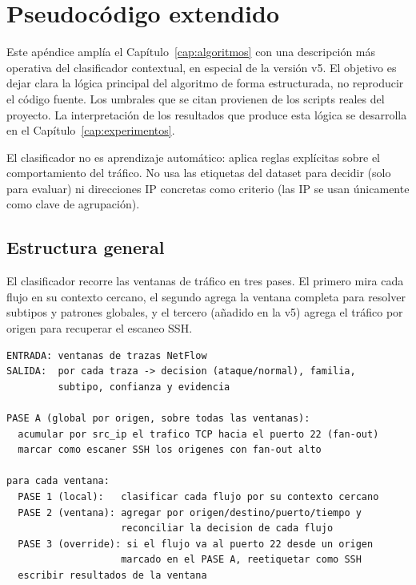 \chapter{Pseudocódigo extendido}
\label{ap:pseudocodigo}

Este apéndice amplía el Capítulo~\ref{cap:algoritmos} con una descripción más operativa del clasificador contextual, en especial de la versión v5. El objetivo es dejar clara la lógica principal del algoritmo de forma estructurada, no reproducir el código fuente. Los umbrales que se citan provienen de los scripts reales del proyecto. La interpretación de los resultados que produce esta lógica se desarrolla en el Capítulo~\ref{cap:experimentos}.

El clasificador no es aprendizaje automático: aplica reglas explícitas sobre el comportamiento del tráfico. No usa las etiquetas del dataset para decidir (solo para evaluar) ni direcciones IP concretas como criterio (las IP se usan únicamente como clave de agrupación).

\section{Estructura general}
\label{sec:apd_general}

El clasificador recorre las ventanas de tráfico en tres pases. El primero mira cada flujo en su contexto cercano, el segundo agrega la ventana completa para resolver subtipos y patrones globales, y el tercero (añadido en la v5) agrega el tráfico por origen para recuperar el escaneo SSH.

\begin{small}
\begin{verbatim}
ENTRADA: ventanas de trazas NetFlow
SALIDA:  por cada traza -> decision (ataque/normal), familia,
         subtipo, confianza y evidencia

PASE A (global por origen, sobre todas las ventanas):
  acumular por src_ip el trafico TCP hacia el puerto 22 (fan-out)
  marcar como escaner SSH los origenes con fan-out alto

para cada ventana:
  PASE 1 (local):   clasificar cada flujo por su contexto cercano
  PASE 2 (ventana): agregar por origen/destino/puerto/tiempo y
                    reconciliar la decision de cada flujo
  PASE 3 (override): si el flujo va al puerto 22 desde un origen
                    marcado en el PASE A, reetiquetar como SSH
  escribir resultados de la ventana
\end{verbatim}
\end{small}


